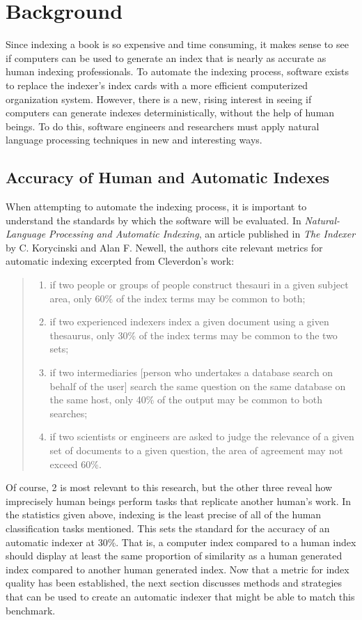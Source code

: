 \section{Background}
Since indexing a book is so expensive and time consuming, it makes sense to see if computers can be used to generate an index that is nearly as accurate as human indexing professionals.
To automate the indexing process, software exists to replace the indexer's index cards with a more efficient computerized organization system.
However, there is a new, rising interest in seeing if computers can generate indexes deterministically, without the help of human beings.
To do this, software engineers and researchers must apply natural language processing techniques in new and interesting ways.

\subsection{Accuracy of Human and Automatic Indexes}

When attempting to automate the indexing process, it is important to understand the standards by which the software will be evaluated.
In {\it Natural-Language Processing and Automatic Indexing}, an article published in {\it The Indexer} by C. Korycinski and Alan F. Newell, the authors cite relevant metrics for automatic indexing excerpted from Cleverdon's work:

\begin{quote}
\begin{enumerate}
\item if two people or groups of people construct thesauri in a given subject area, only 60\% of the index terms may be common to both;
\item if two experienced indexers index a given document using a given thesaurus, only 30\% of the index terms may be common to the two sets;
\item if two intermediaries [person who undertakes a database search on behalf of the user] search the same question on the same database on the same host, only 40\% of the output may be common to both searches;
\item if two scientists or engineers are asked to judge the relevance of a given set of documents to a given question, the area of agreement may not exceed 60\%.~\cite{automatic-indexing}
\end{enumerate}
\end{quote}

Of course, 2 is most relevant to this research, but the other three reveal how imprecisely human beings perform tasks that replicate another human's work.
In the statistics given above, indexing is the least precise of all of the human classification tasks mentioned.
This sets the standard for the accuracy of an automatic indexer at 30\%.
That is, a computer index compared to a human index should display at least the same proportion of similarity as a human generated index compared to another human generated index.
Now that a metric for index quality has been established, the next section discusses methods and strategies that can be used to create an automatic indexer that might be able to match this benchmark.

